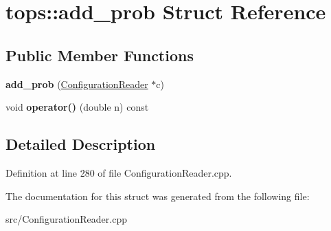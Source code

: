 \hypertarget{structtops_1_1add__prob}{}\section{tops\+:\+:add\+\_\+prob Struct Reference}
\label{structtops_1_1add__prob}
\subsection*{Public Member Functions}
\begin{DoxyCompactItemize}
\item 
\mbox{\label{structtops_1_1add__prob_aa9a4e2e3ce5a73d05e4db2b9273bc1bb}} 
{\bfseries add\+\_\+prob} (\hyperlink{classtops_1_1ConfigurationReader}{Configuration\+Reader} $\ast$c)
\item 
\mbox{\label{structtops_1_1add__prob_afde6557adf2587a5f7902dd9985c93af}} 
void {\bfseries operator()} (double n) const
\end{DoxyCompactItemize}


\subsection{Detailed Description}


Definition at line 280 of file Configuration\+Reader.\+cpp.



The documentation for this struct was generated from the following file\+:\begin{DoxyCompactItemize}
\item 
src/Configuration\+Reader.\+cpp\end{DoxyCompactItemize}
